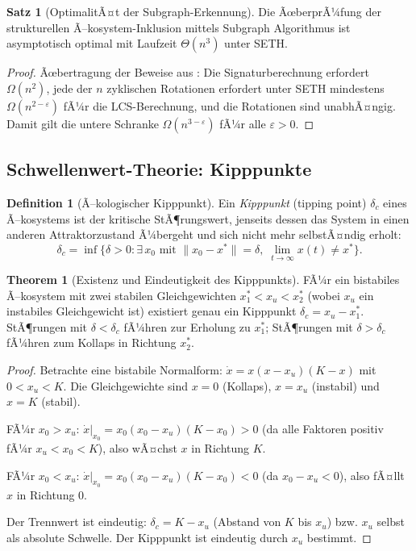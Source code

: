 ﻿\documentclass[a4paper,12pt]{article}
\theoremstyle{definition}
\newtheorem{definition}{Definition}
\newtheorem{satz}{Satz}
\newtheorem{theorem}{Theorem}
\begin{document}
\begin{satz}[OptimalitÃ¤t der Subgraph-Erkennung]
	\label{satz:optimalitaet_subgraph}
	Die ÃœberprÃ¼fung der strukturellen Ã–kosystem-Inklusion mittels Subgraph Algorithmus ist asymptotisch optimal mit Laufzeit $\Theta(n^3)$ unter SETH.
\end{satz}

\begin{proof}
	Ãœbertragung der Beweise aus \cite{epp2026subgraph}: Die Signaturberechnung erfordert $\Omega(n^2)$, jede der $n$ zyklischen Rotationen erfordert unter SETH mindestens $\Omega(n^{2-\varepsilon})$ fÃ¼r die LCS-Berechnung, und die Rotationen sind unabhÃ¤ngig. Damit gilt die untere Schranke $\Omega(n^{3-\varepsilon})$ fÃ¼r alle $\varepsilon > 0$. \qedhere
\end{proof}

\subsection{Schwellenwert-Theorie: Kipppunkte}

\begin{definition}[Ã–kologischer Kipppunkt]
	Ein \emph{Kipppunkt} (tipping point) $\delta_c$ eines Ã–kosystems ist der kritische StÃ¶rungswert, jenseits dessen das System in einen anderen Attraktorzustand Ã¼bergeht und sich nicht mehr selbstÃ¤ndig erholt:
	\[
	\delta_c = \inf\bigl\{\delta > 0 : \exists\, x_0 \text{ mit } \|x_0 - x^*\| = \delta,\; \lim_{t\to\infty} x(t) \neq x^*\bigr\}.
	\]
\end{definition}

\begin{theorem}[Existenz und Eindeutigkeit des Kipppunkts]
	\label{thm:kipppunkt}
	FÃ¼r ein bistabiles Ã–kosystem mit zwei stabilen Gleichgewichten $x_1^* < x_u < x_2^*$ (wobei $x_u$ ein instabiles Gleichgewicht ist) existiert genau ein Kipppunkt $\delta_c = x_u - x_1^*$. StÃ¶rungen mit $\delta < \delta_c$ fÃ¼hren zur Erholung zu $x_1^*$; StÃ¶rungen mit $\delta > \delta_c$ fÃ¼hren zum Kollaps in Richtung $x_2^*$.
\end{theorem}

\begin{proof}
	Betrachte eine bistabile Normalform: $\dot{x} = x(x - x_u)(K - x)$ mit $0 < x_u < K$. Die Gleichgewichte sind $x=0$ (Kollaps), $x = x_u$ (instabil) und $x = K$ (stabil).

	FÃ¼r $x_0 > x_u$: $\dot{x}|_{x_0} = x_0(x_0 - x_u)(K - x_0) > 0$ (da alle Faktoren positiv fÃ¼r $x_u < x_0 < K$), also wÃ¤chst $x$ in Richtung $K$. 

	FÃ¼r $x_0 < x_u$: $\dot{x}|_{x_0} = x_0(x_0 - x_u)(K - x_0) < 0$ (da $x_0 - x_u < 0$), also fÃ¤llt $x$ in Richtung $0$.

	Der Trennwert ist eindeutig: $\delta_c = K - x_u$ (Abstand von $K$ bis $x_u$) bzw. $x_u$ selbst als absolute Schwelle. Der Kipppunkt ist eindeutig durch $x_u$ bestimmt. \qedhere
\end{proof}
\end{document}
